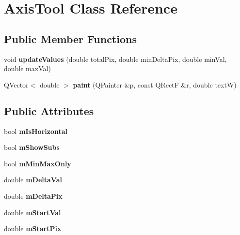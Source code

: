\hypertarget{class_axis_tool}{\section{Axis\-Tool Class Reference}
\label{class_axis_tool}
}
\subsection*{Public Member Functions}
\begin{DoxyCompactItemize}
\item 
\hypertarget{class_axis_tool_a9d356d40fad40b1e6cf0152dc7a803df}{void {\bfseries update\-Values} (double total\-Pix, double min\-Delta\-Pix, double min\-Val, double max\-Val)}\label{class_axis_tool_a9d356d40fad40b1e6cf0152dc7a803df}

\item 
\hypertarget{class_axis_tool_a3c82fb8de1ce6165f479b88c3ee578bc}{Q\-Vector$<$ double $>$ {\bfseries paint} (Q\-Painter \&p, const Q\-Rect\-F \&r, double text\-W)}\label{class_axis_tool_a3c82fb8de1ce6165f479b88c3ee578bc}

\end{DoxyCompactItemize}
\subsection*{Public Attributes}
\begin{DoxyCompactItemize}
\item 
\hypertarget{class_axis_tool_af868f091284a43333fa33ae81b3f97a6}{bool {\bfseries m\-Is\-Horizontal}}\label{class_axis_tool_af868f091284a43333fa33ae81b3f97a6}

\item 
\hypertarget{class_axis_tool_a1f214cc8e207685073205db671c1be52}{bool {\bfseries m\-Show\-Subs}}\label{class_axis_tool_a1f214cc8e207685073205db671c1be52}

\item 
\hypertarget{class_axis_tool_a83a10501c9eddbb9a6bedd74ae9ce926}{bool {\bfseries m\-Min\-Max\-Only}}\label{class_axis_tool_a83a10501c9eddbb9a6bedd74ae9ce926}

\item 
\hypertarget{class_axis_tool_abe3f080f10c0f80b302e7ce6adfed805}{double {\bfseries m\-Delta\-Val}}\label{class_axis_tool_abe3f080f10c0f80b302e7ce6adfed805}

\item 
\hypertarget{class_axis_tool_a2fdc48a917c0de9af3c091e9fc8d7339}{double {\bfseries m\-Delta\-Pix}}\label{class_axis_tool_a2fdc48a917c0de9af3c091e9fc8d7339}

\item 
\hypertarget{class_axis_tool_aae91c9e88098248246085b112d9f2d53}{double {\bfseries m\-Start\-Val}}\label{class_axis_tool_aae91c9e88098248246085b112d9f2d53}

\item 
\hypertarget{class_axis_tool_a416b1d8ab060538826b79fc8c412c6fd}{double {\bfseries m\-Start\-Pix}}\label{class_axis_tool_a416b1d8ab060538826b79fc8c412c6fd}

\end{DoxyCompactItemize}


